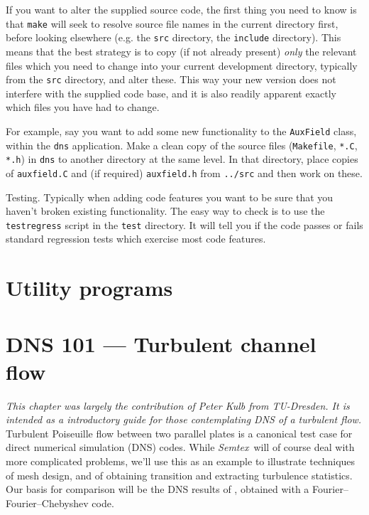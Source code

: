 \documentclass[11pt]{report}
\newcommand{\Semtex}{\emph{Semtex}} \newcommand{\Dog}{\emph{Dog}}
\begin{document}
If you want to alter the supplied source code, the first thing you
need to know is that \texttt{make} will seek to resolve source file
names in the current directory first, before looking elsewhere
(e.g. the \texttt{src} directory, the \texttt{include} directory).
This means that the best strategy is to copy (if not already present)
\emph{only} the relevant files which you need to change into your
current development directory, typically from the \texttt{src}
directory, and alter these. This way your new version does not
interfere with the supplied code base, and it is also readily apparent
exactly which files you have had to change.

For example, say you want to add some new functionality to the
\texttt{AuxField} class, within the \texttt{dns} application. Make a
clean copy of the source files (\texttt{Makefile}, \texttt{*.C},
\texttt{*.h}) in \texttt{dns} to another directory at the same
level. In that directory, place copies of \texttt{auxfield.C} and (if
required) \texttt{auxfield.h} from \texttt{../src} and then work on
these.

Testing.  Typically when adding code features you want to be sure that
you haven't broken existing functionality.  The easy way to check is
to use the \verb|testregress| script in the \verb|test| directory. It
will tell you if the code passes or fails standard regression tests
which exercise most code features.


\chapter{Utility programs}
\label{sec.util}


\chapter{DNS 101 --- Turbulent channel flow}
\label{sec.dns101}

\textsl{This chapter was largely the contribution of Peter Kulb from
  TU-Dresden.  It is intended as a introductory guide for those
  contemplating DNS of a turbulent flow.}\\

Turbulent Poiseuille flow between two parallel plates is a canonical
test case for direct numerical simulation (DNS) codes.  While
\Semtex\ will of course deal with more complicated problems, we'll use
this as an example to illustrate techniques of mesh design, and of
obtaining transition and extracting turbulence statistics.  Our basis
for comparison will be the DNS results of \citet*{kmm87}, obtained
with a Fourier--Fourier--Chebyshev code.
\end{document}
